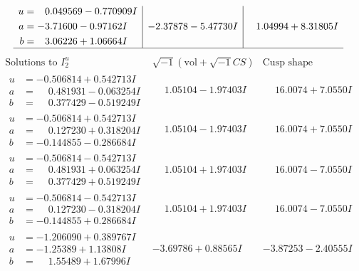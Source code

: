 \documentclass[1p]{elsarticle_modified}
\theoremstyle{definition}
\newcommand{\I}{\sqrt{-1}}
\begin{document}
$$\begin{array}{c|c|c}
\begin{aligned}
u &= \phantom{-}0.049569 - 0.770909 I \\
a &= -3.71600 - 0.97162 I \\
b &= \phantom{-}3.06226 + 1.06664 I\end{aligned}
 & -2.37878 - 5.47730 I & \phantom{-}1.04994 + 8.31805 I\\
 \hline 
 \end{array}$$\newpage$$\begin{array}{c|c|c}  
\text{Solutions to }I^u_{2}& \I (\text{vol} + \sqrt{-1}CS) & \text{Cusp shape}\\
 \hline 
\begin{aligned}
u &= -0.506814 + 0.542713 I \\
a &= \phantom{-}0.481931 - 0.063254 I \\
b &= \phantom{-}0.377429 - 0.519249 I\end{aligned}
 & \phantom{-}1.05104 - 1.97403 I & \phantom{-}16.0074 + 7.0550 I \\ \hline\begin{aligned}
u &= -0.506814 + 0.542713 I \\
a &= \phantom{-}0.127230 + 0.318204 I \\
b &= -0.144855 - 0.286684 I\end{aligned}
 & \phantom{-}1.05104 - 1.97403 I & \phantom{-}16.0074 + 7.0550 I \\ \hline\begin{aligned}
u &= -0.506814 - 0.542713 I \\
a &= \phantom{-}0.481931 + 0.063254 I \\
b &= \phantom{-}0.377429 + 0.519249 I\end{aligned}
 & \phantom{-}1.05104 + 1.97403 I & \phantom{-}16.0074 - 7.0550 I \\ \hline\begin{aligned}
u &= -0.506814 - 0.542713 I \\
a &= \phantom{-}0.127230 - 0.318204 I \\
b &= -0.144855 + 0.286684 I\end{aligned}
 & \phantom{-}1.05104 + 1.97403 I & \phantom{-}16.0074 - 7.0550 I \\ \hline\begin{aligned}
u &= -1.206090 + 0.389767 I \\
a &= -1.25389 + 1.13808 I \\
b &= \phantom{-}1.55489 + 1.67996 I\end{aligned}
 & -3.69786 + 0.88565 I & -3.87253 - 2.40555 I \\ \hline\begin{aligned}

\end{aligned}
\end{array}$$
\end{document}
